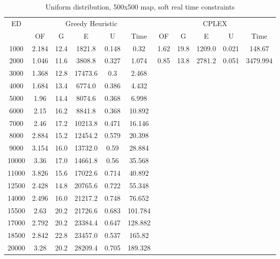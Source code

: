 \begin{table}[htb]
	\centering
	\begin{tabular}{|c|c|c|c|c|c|c|c|c|c|c|}
		\hline
		\multirow{2}{*}{ED} & \multicolumn{5}{c|}{Greedy Heuristic} & \multicolumn{5}{c|}{CPLEX}\\ 
		\cline{2-11}
& OF & G & E & U & Time & OF & G & E & U & Time\\ 
		\hline
		1000 & 2.184 & 12.4 & 1821.8 & 0.148 & 0.32 & 1.62 & 19.8 & 1209.0 & 0.021 & 148.67 \\ 
		2000 & 1.046 & 11.6 & 3808.8 & 0.327 & 1.074 & 0.85 & 13.8 & 2781.2 & 0.051 & 3479.994 \\ 
		3000 & 1.368 & 12.8 & 17473.6 & 0.3 & 2.468 & & & & &  \\ 
		4000 & 1.684 & 13.4 & 6774.0 & 0.386 & 4.432 & & & & &  \\ 
		5000 & 1.96 & 14.4 & 8074.6 & 0.368 & 6.998 & & & & &  \\ 
		6000 & 2.15 & 16.2 & 8841.8 & 0.368 & 10.892 & & & & &  \\ 
		7000 & 2.46 & 17.2 & 10213.8 & 0.471 & 16.146 & & & & &  \\ 
		8000 & 2.884 & 15.2 & 12454.2 & 0.579 & 20.398 & & & & &  \\ 
		9000 & 3.154 & 16.0 & 13732.0 & 0.59 & 28.884 & & & & &  \\ 
		10000 & 3.36 & 17.0 & 14661.8 & 0.56 & 35.568 & & & & &  \\ 
		11000 & 3.826 & 15.6 & 17022.6 & 0.714 & 40.892 & & & & &  \\ 
		12500 & 2.428 & 14.8 & 20765.6 & 0.722 & 55.348 & & & & &  \\ 
		14000 & 2.496 & 16.0 & 21217.2 & 0.748 & 76.652 & & & & &  \\ 
		15500 & 2.63 & 20.2 & 21726.6 & 0.683 & 101.784 & & & & &  \\ 
		17000 & 2.792 & 20.2 & 23384.4 & 0.647 & 128.882 & & & & &  \\ 
		18500 & 2.842 & 22.8 & 23457.0 & 0.537 & 165.82 & & & & &  \\ 
		20000 & 3.28 & 20.2 & 28209.4 & 0.705 & 189.328 & & & & &  \\ 
		\hline 
	\end{tabular} 
	\caption{Uniform distribution, 500x500 map, soft real time constraints} 
	\label{tab:unif_soft_n_esc_500} 
\end{table} 

